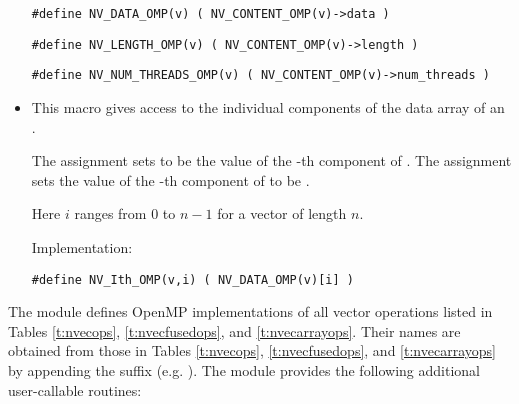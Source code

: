 \begin{itemize}
  \verb|#define NV_DATA_OMP(v) ( NV_CONTENT_OMP(v)->data )|
  
  \verb|#define NV_LENGTH_OMP(v) ( NV_CONTENT_OMP(v)->length )|

  \verb|#define NV_NUM_THREADS_OMP(v) ( NV_CONTENT_OMP(v)->num_threads )|

\item {}                                               
                                                            
  This macro gives access to the individual components of the data
  array of an .

  The assignment  sets  to be the value of 
  the -th component of . The assignment    
  sets the value of the -th component of  to be .        
  
  Here $i$ ranges from $0$ to $n-1$ for a vector of length $n$.

  Implementation:

  \verb|#define NV_Ith_OMP(v,i) ( NV_DATA_OMP(v)[i] )|

\end{itemize}
The {\nvecopenmp} module defines OpenMP implementations of all vector operations listed
in Tables \ref{t:nvecops}, \ref{t:nvecfusedops}, and \ref{t:nvecarrayops}. Their names are
obtained from those in Tables \ref{t:nvecops}, \ref{t:nvecfusedops}, and
\ref{t:nvecarrayops} by appending the suffix  (e.g. ).
The module {\nvecopenmp} provides the following additional user-callable routines:

